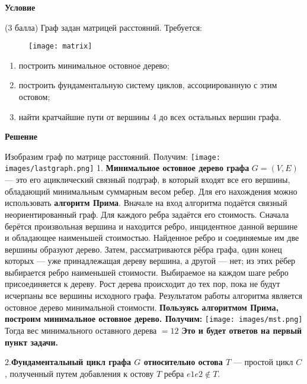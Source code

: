 \documentclass[a4paper]{article}
\begin{document}
\begin{center}
\begin{flushleft}
    \textbf{{\Large Условие}}
\end{flushleft}
\begin{flushleft}
(3 балла) Граф задан матрицей расстояний. Требуется:
\begin{figure}[h]
\texttt{[image: matrix]}
\centering
\end{figure}
\begin{enumerate}
  \item построить минимальное остовное дерево;
  \item построить фундаментальную систему циклов, ассоциированную с этим остовом;
  \item найти кратчайшие пути от вершины 4 до всех остальных вершин графа.
\end{enumerate}
\end{flushleft}
\hfill
\begin{flushleft}
    \textbf{{\Large Решение}}
\end{flushleft}
\begin{flushleft}
    Изобразим граф по матрице расстояний. Получим:
    \texttt{[image: images/lastgraph.png]}
    1.
    \textbf{Минимальное остовное дерево графа} $G=(V,E)$— это его ациклический связный подграф, в который входят все его вершины, обладающий минимальным суммарным весом ребер.
    Для его нахождения можно использовать \textbf{алгоритм Прима}. Вначале на вход алгоритма подаётся связный неориентированный граф. Для каждого ребра задаётся его стоимость. Сначала берётся произвольная вершина и находится ребро, инцидентное данной вершине и обладающее наименьшей стоимостью. Найденное ребро и соединяемые им две вершины образуют дерево. Затем, рассматриваются рёбра графа, один конец которых — уже принадлежащая дереву вершина, а другой — нет; из этих рёбер выбирается ребро наименьшей стоимости. Выбираемое на каждом шаге ребро присоединяется к дереву. Рост дерева происходит до тех пор, пока не будут исчерпаны все вершины исходного графа.
    Результатом работы алгоритма является остовное дерево минимальной стоимости.
    \textbf{Пользуясь алгоритмом Прима, построим минимальное остовное дерево.
    Получим:}
    \texttt{[image: images/mst.png]}
    Тогда вес минимального оставного дерева $= 12$
    \textbf{Это и будет ответов на первый пункт задачи.}
\end{flushleft}
\begin{flushleft}
2.\textbf{Фундаментальный цикл графа $G$ относительно остова $T$} — простой цикл $C$, полученный путем добавления к остову $T$ ребра $e1e2∉T$.

\end{flushleft}
\end{center}
\end{document}
